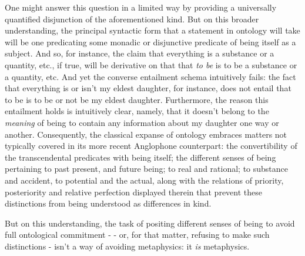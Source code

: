 \documentclass[]{article}
\begin{document}
One might answer this question in a limited way by providing a universally quantified disjunction of the aforementioned kind. 
But on this broader understanding, 
the principal syntactic form that a statement in ontology will take will be one predicating some monadic or disjunctive predicate of being itself as a subject. 
And so, for instance, the claim that everything is a substance or a quantity, etc., 
if true, 
will be derivative on that that \emph{to be} is to be a substance or a quantity, etc.
And yet the converse entailment schema intuitively fails: 
the fact that everything is or isn't my eldest daughter, for instance, 
does not entail that to be is to be or not be my eldest daughter. 
Furthermore, the reason this entailment holds is intuitively clear, 
namely, 
that it doesn't belong to the \emph{meaning} of being to contain any information about my daughter one way or another. 
Consequently, the classical expanse of ontology embraces matters not typically covered in its more recent Anglophone counterpart: 
the convertibility of the transcendental predicates with being itself;  
the different senses of being pertaining 
to past present, and future being;
to real and rational;
to substance and accident, 
to potential and the actual, 
along with the relations of priority, posteriority and relative perfection displayed therein
that prevent these distinctions from being understood as differences in kind. 

But on this understanding, the task of positing different senses of being to avoid full ontological commitment - 
- or, for that matter, refusing to make such distinctions - 
isn't a way of avoiding metaphysics: it \emph{is} metaphysics.
\end{document}
